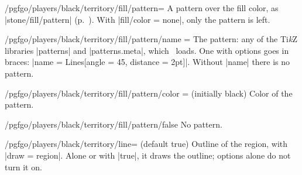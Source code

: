 	\begin{key}{/pgfgo/players/black/territory/fill/pattern=}
		A pattern over the fill color, as |stone/fill/pattern| (p.~\pageref{sec:piedras}). With |fill/color = none|, only the pattern is left.

		\begin{codeexample}[]
			\begin{goban}[5]
			\end{goban}
		\end{codeexample}
	\end{key}

	\begin{key}{/pgfgo/players/black/territory/fill/pattern/name = }
		The pattern: any of the Ti\emph{k}Z libraries |patterns| and |patterns.meta|, which \pgfgoname\ loads. One with options goes in braces: |name = {Lines[angle = 45, distance = 2pt]}|. Without |name| there is no pattern.
	\end{key}

	\begin{key}{/pgfgo/players/black/territory/fill/pattern/color =  (initially black)}
		Color of the pattern.
	\end{key}

	\begin{key}{/pgfgo/players/black/territory/fill/pattern/false}
		No pattern.
	\end{key}

	\begin{key}{/pgfgo/players/black/territory/line= (default true)}
		Outline of the region, with |draw = region|. Alone or with |true|, it draws the outline; options alone do not turn it on.

		\begin{codeexample}[width=4.75cm]
			\begin{goban}[label = {at = {above, left}}]

			\end{goban}
		\end{codeexample}
	\end{key}

